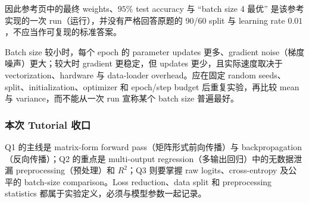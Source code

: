 \begin{checkedsolution}
因此参考页中的最终 weights、$95\%$ test accuracy 与 ``batch size 4 最优'' 是该参考实现的一次 run（运行），并没有严格回答原题的 90/60 split 与 learning rate $0.01$，不应当作可复现的标准答案。

Batch size 较小时，每个 epoch 的 parameter updates 更多、gradient noise（梯度噪声）更大；较大时 gradient 更稳定，但 updates 更少，且实际速度取决于 vectorization、hardware 与 data-loader overhead。应在固定 random seeds、split、initialization、optimizer 和 epoch/step budget 后重复实验，再比较 mean 与 variance，而不能从一次 run 宣称某个 batch size 普遍最好。
\end{checkedsolution}

\subsubsection*{本次 Tutorial 收口}

Q1 的主线是 matrix-form forward pass（矩阵形式前向传播）与 backpropagation（反向传播）；Q2 的重点是 multi-output regression（多输出回归）中的无数据泄漏 preprocessing（预处理）和 $R^2$；Q3 则要掌握 raw logits、cross-entropy 及公平的 batch-size comparison。Loss reduction、data split 和 preprocessing statistics 都属于实验定义，必须与模型参数一起记录。
